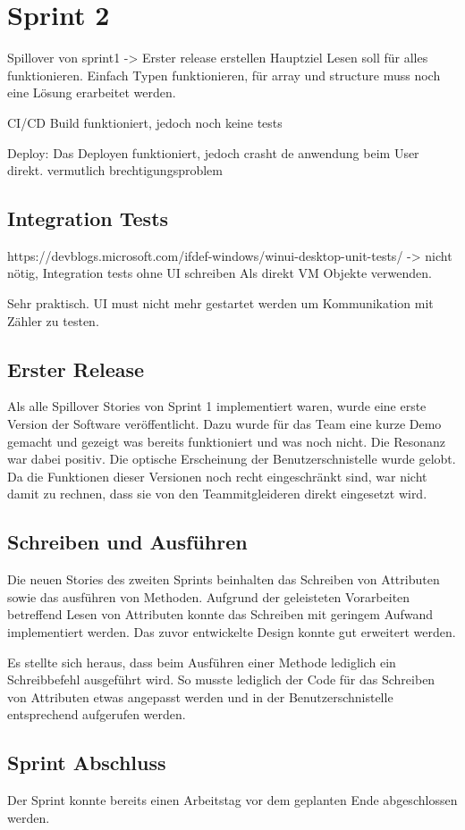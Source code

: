 \section{Sprint 2}
Spillover von sprint1
-> Erster release erstellen Hauptziel
Lesen soll für alles funktionieren.
Einfach Typen funktionieren, für array und structure muss noch eine Lösung erarbeitet werden.

CI/CD
Build funktioniert, jedoch noch keine tests

Deploy:
Das Deployen funktioniert, jedoch crasht de anwendung beim User direkt.
vermutlich brechtigungsproblem


\subsection{Integration Tests}
https://devblogs.microsoft.com/ifdef-windows/winui-desktop-unit-tests/
-> nicht nötig, Integration tests ohne UI schreiben
Als direkt VM Objekte verwenden.


Sehr praktisch. UI must nicht mehr gestartet werden um Kommunikation mit Zähler zu testen.


\subsection{Erster Release}
Als alle Spillover Stories von Sprint 1 implementiert waren, wurde eine erste Version der Software veröffentlicht.
Dazu wurde für das Team eine kurze Demo gemacht und gezeigt was bereits funktioniert und was noch nicht. 
Die Resonanz war dabei positiv. Die optische Erscheinung der Benutzerschnistelle wurde gelobt.
Da die Funktionen dieser Versionen noch recht eingeschränkt sind, war nicht damit zu rechnen, dass sie von den Teammitgleideren direkt eingesetzt wird.



\subsection{Schreiben und Ausführen}
Die neuen Stories des zweiten Sprints beinhalten das Schreiben von Attributen sowie das ausführen von Methoden.
Aufgrund der geleisteten Vorarbeiten betreffend Lesen von Attributen konnte das Schreiben mit geringem Aufwand implementiert werden.
Das zuvor entwickelte Design konnte gut erweitert werden.

Es stellte sich heraus, dass beim Ausführen einer Methode lediglich ein Schreibbefehl ausgeführt wird.
So musste lediglich der Code für das Schreiben von Attributen etwas angepasst werden und in der Benutzerschnistelle entsprechend aufgerufen werden.


\subsection{Sprint Abschluss}
Der Sprint konnte bereits einen Arbeitstag vor dem geplanten Ende abgeschlossen werden.